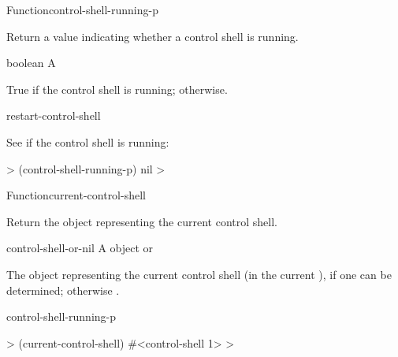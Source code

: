 \documentclass[10pt,twoside,english,pdftex]{article}
\begin{document}
\begin{functiondoc}{Function}{control-shell-running-p}{\noargs{}
    }
%

\fnsyntax

\fnpurpose Return a value indicating whether a control shell is running.

\fnpackage {}

\fnmodule {}

\fnargs
\begin{args}{boolean}
\arg[boolean] A 
\end{args}

\fnreturns True if the control shell is running; \nil{} otherwise.

\begin{alsos}{restart-control-shell}
\end{alsos}

\fnexample
See if the control shell is running:
%
\W\supp
\begin{example}
  > (control-shell-running-p)
  nil
  >
\end{example}

\end{functiondoc}


\begin{functiondoc}{Function}{current-control-shell}{\noargs{} 
    }
%

\fnsyntax

\fnpurpose Return the object representing the current control shell.

\fnpackage {}

\fnmodule {}

\fnargs
\begin{args}{control-shell-or-nil}
 A  object or \nil{}
\end{args}

\fnreturns The object representing the current control shell (in the current
), if one can be determined; otherwise \nil.

\begin{alsos}{control-shell-running-p}
\end{alsos}

\fnexample
%
\W\supp
\begin{example}
  > (current-control-shell)
  #<control-shell 1>
  >
\end{example}

\end{functiondoc}
\end{document}
